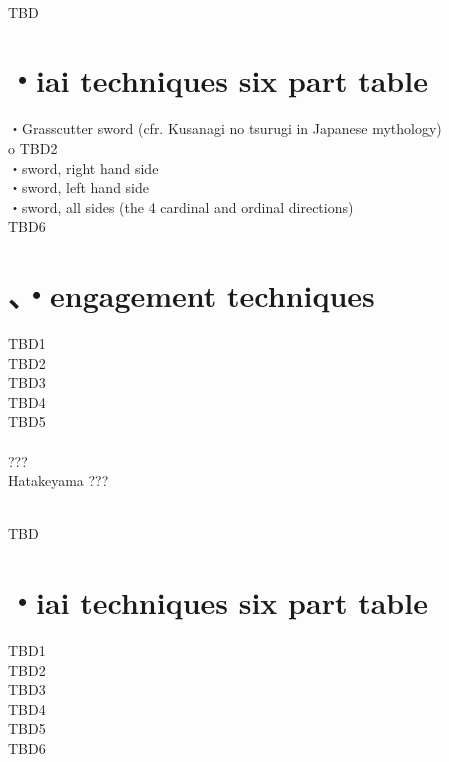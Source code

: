 \documentclass[dvipdfmx, a4paper, 12pt]{utarticle}
\begin{document}
\begin{CJK*}{UTF8}{min}
\begin{landscape}
\setcounter{section}{0}
\newpage
\pagestyle{empty}
\\
TBD
\section{・iai techniques six part table}
\noindent {}・Grasscutter sword (cfr. Kusanagi no tsurugi in Japanese mythology)\\
o
TBD2\\
・sword, right hand side\\
・sword, left hand side\\
・sword, all sides (the 4 cardinal and ordinal directions)\\
TBD6\\
\section{、・engagement techniques}
\noindent TBD1\\
TBD2\\
TBD3\\
TBD4\\
TBD5\\
\\
???\\
Hatakeyama ???

\setcounter{section}{0}
\newpage
\pagestyle{empty}
\\
TBD
\section{・iai techniques six part table}
\noindent TBD1\\
TBD2\\
TBD3\\
TBD4\\
TBD5\\
TBD6\\

\end{landscape}
\end{CJK*}
\end{document}
